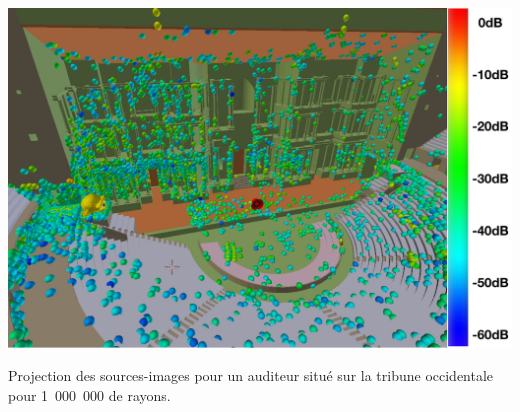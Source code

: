\begin{figureth}
	\includegraphics[width=\linewidth]{images/Listener10}
		\caption{Projection des sources-images pour un auditeur situé sur la tribune occidentale pour 1~000~000 de rayons.}
	\label{listener10}
\end{figureth}
%

